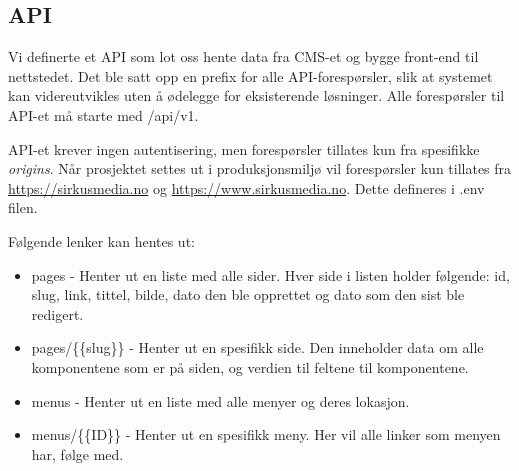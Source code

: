\subsection{API}
Vi definerte et API som lot oss hente data fra CMS-et og bygge front-end til nettstedet. Det ble satt opp en prefix for alle API-forespørsler, slik at systemet kan videreutvikles uten å ødelegge for eksisterende løsninger. Alle forespørsler til API-et må starte med /api/v1.

API-et krever ingen autentisering, men forespørsler tillates kun fra spesifikke \textit{origins}. Når prosjektet settes ut i produksjonsmiljø vil forespørsler kun tillates fra \url{https://sirkusmedia.no} og \url{https://www.sirkusmedia.no}. Dette defineres i .env filen.

Følgende lenker kan hentes ut:
\begin{itemize}
  \item pages - Henter ut en liste med alle sider. Hver side i listen holder følgende: id, slug, link, tittel, bilde, dato den ble opprettet og dato som den sist ble redigert.
  \item pages/\{\{slug\}\} - Henter ut en spesifikk side. Den inneholder data om alle komponentene som er på siden, og verdien til feltene til komponentene.
  \item menus - Henter ut en liste med alle menyer og deres lokasjon.
  \item menus/\{\{ID\}\} - Henter ut en spesifikk meny. Her vil alle linker som menyen har, følge med.
\end{itemize}

